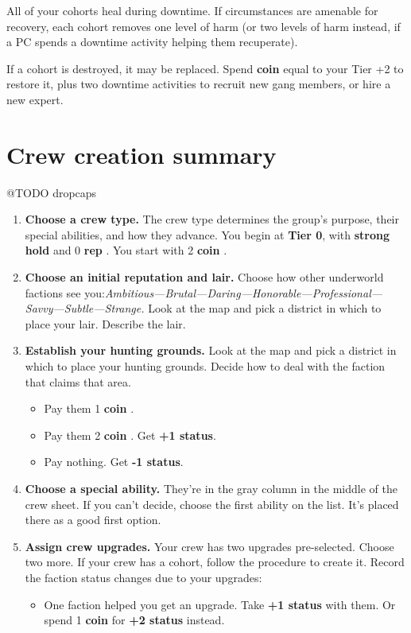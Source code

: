 \documentclass[11pt,oneside]{book}
\newcommand{\gameterm}[1]{\textbf{#1}}
\begin{document}
All of your cohorts heal during downtime. If circumstances are amenable for recovery, each cohort removes one level of harm (or two levels of harm instead, if a PC spends a downtime activity helping them recuperate).

If a cohort is destroyed, it may be replaced. Spend \gameterm{coin}  equal to your Tier +2 to restore it, plus two downtime activities to recruit new gang members, or hire a new expert.

\section{Crew creation summary}

@TODO dropcaps

\begin{enumerate}
	\item \textbf{Choose a crew type.} The crew type determines the group’s purpose, their special abilities, and how they advance.
		You begin at \textbf{Tier 0}, with \textbf{strong hold} and 0 \gameterm{rep} . You start with 2 \gameterm{coin} .
	\item \textbf{Choose an initial reputation and lair.} Choose how other underworld factions see you:\emph{Ambitious---Brutal---Daring---Honorable---Professional---Savvy---Subtle---Strange.} Look at the map and pick a district in which to place your lair. Describe the lair.
	\item \textbf{Establish your hunting grounds.} Look at the map and pick a district in which to place your hunting grounds. Decide how to deal with the faction that claims that area.
		\begin{itemize}
		\item Pay them 1 \gameterm{coin} .
		\item Pay them 2 \gameterm{coin} . Get \textbf{+1 status}.
		\item Pay nothing. Get \textbf{-1 status}.
		\end{itemize}
	\item \textbf{Choose a special ability.} They’re in the gray column in the middle of the crew sheet. If you can’t decide, choose the first ability on the list. It’s placed there as a good first option.
	\item \textbf{Assign crew upgrades.} Your crew has two upgrades pre-selected. Choose two more. If your crew has a cohort, follow the procedure to create it. Record the faction status changes due to your upgrades:
		\begin{itemize}
		\item One faction helped you get an upgrade. Take \textbf{+1 status} with them. Or spend 1 \gameterm{coin}  for \textbf{+2 status} instead.

\end{itemize}
\end{enumerate}
\end{document}
